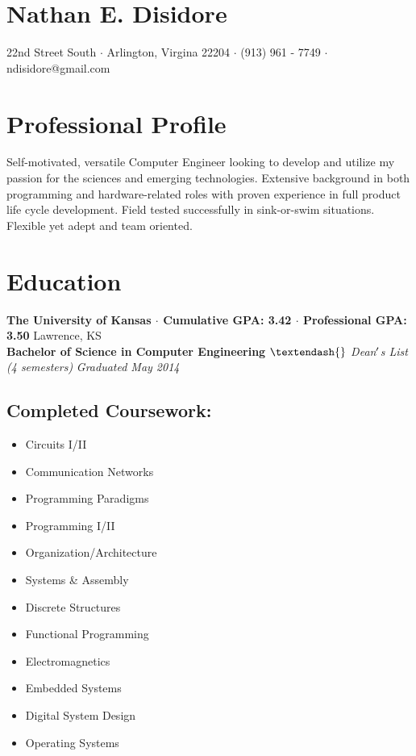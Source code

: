 \documentclass[10pt]{article}
\newcommand{\startsquarepar}{\par\begingroup \parfillskip 0pt \relax}
\newcommand{\stopsquarepar}{\par\endgroup}
\newenvironment{ninept}{\fontsize{9}{12}\selectfont}{\par}
\begin{document}
\pagestyle{empty} %

\section*{\Huge Nathan E. Disidore}
\startsquarepar
  3429 22nd Street South $\cdot$ Arlington, Virgina 22204 $\cdot$ (913) 961 - 7749 $\cdot$ ndisidore@gmail.com
\stopsquarepar

\section*{Professional Profile}
Self-motivated, versatile Computer Engineer looking to develop and utilize my passion for the sciences and emerging technologies. Extensive background in both programming and hardware-related roles with proven experience in full product life cycle development. Field tested successfully in sink-or-swim situations. Flexible yet adept and team oriented.

\section*{Education}
\textbf{The University of Kansas $\cdot$ Cumulative GPA: 3.42 $\cdot$ Professional GPA: 3.50}
\hfill
Lawrence, KS \\
\textbf{Bachelor of Science in Computer Engineering}
\textit{$\textendash{}$ Dean$\rq$s List (4 semesters)}
\hfill
\textit{Graduated May 2014}
\subsection*{Completed Coursework:}
\begin{ninept}
  \begin{multicols}{4}
    \begin{itemize}
      \item Circuits I/II
      \item Communication Networks
      \item Programming Paradigms
      \item Programming I/II
      \item Organization/Architecture
      \item Systems \& Assembly
      \item Discrete Structures
      \item Functional Programming
      \item Electromagnetics
      \item Embedded Systems
      \item Digital System Design
      \item Operating Systems
    \end{itemize}
  \end{multicols}
\end{ninept}
\end{document}
